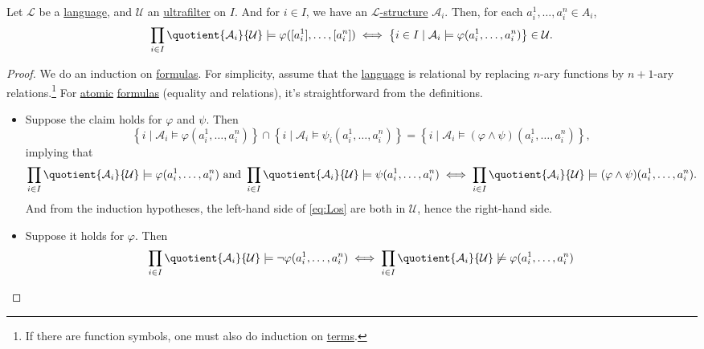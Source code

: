 \begin{theorem}\label{thm:Los}
	Let \(\mathcal{L} \) be a \hyperref[def:language]{language}, and \(\mathcal{U} \) an \hyperref[def:ultrafilter]{ultrafilter} on \(I\). And for \(i\in I\), we have an \hyperref[def:structure]{\(\mathcal{L} \)-structure} \(\mathcal{A} _i\). Then, for each \(a_i^1, \dots , a_i^n\in A_i\),
	\[
		\prod_{i\in I} \quotient{\mathcal{A} _i}{\mathcal{U} } \models \varphi ([a_i^1], \dots , [a_i^n]) \iff \left\{ i\in I \mid \mathcal{A} _i \models \varphi (a_i^1, \dots , a_i^n) \right\} \in \mathcal{U} .
	\]
\end{theorem}
\begin{proof}
	We do an induction on \hyperref[def:formula]{formulas}. For simplicity, assume that the \hyperref[def:language]{language} is relational by replacing \(n\)-ary functions by \(n+1\)-ary relations.\footnote{If there are function symbols, one must also do induction on \hyperref[def:term]{terms}.} For \hyperref[not:atomic]{atomic} \hyperref[def:formula]{formulas} (equality and relations), it's straightforward from the definitions.
	\begin{itemize}
		\item Suppose the claim holds for \(\varphi \) and \(\psi \). Then
		      \begin{equation}\label{eq:Los}
			      \left\{ i \mid \mathcal{A} _i \models \varphi (a_i^1, \dots , a_i^n) \right\}
			      \cap \left\{ i \mid \mathcal{A} _i \models \psi _i(a_i^1, \dots , a_i^n) \right\}
			      = \left\{ i \mid \mathcal{A} _i \models (\varphi \land \psi )(a_i^1, \dots , a_i^n) \right\},
		      \end{equation}
		      implying that
		      \[
			      \prod_{i\in I} \quotient{\mathcal{A} _i}{\mathcal{U} } \models \varphi (a_i^1, \dots , a_i^n)
			      \text{ and } \prod_{i\in I} \quotient{\mathcal{A} _i}{\mathcal{U} } \models \psi (a_i^1, \dots , a_i^n)
			      \iff \prod_{i\in I} \quotient{\mathcal{A} _i}{\mathcal{U} } \models (\varphi \land \psi )(a_i^1, \dots , a_i^n).
		      \]
		      And from the induction hypotheses, the left-hand side of \autoref{eq:Los} are both in \(\mathcal{U} \), hence the right-hand side.
		\item Suppose it holds for \(\varphi \). Then
		      \[
			      \begin{split}
				      \prod_{i\in I} \quotient{\mathcal{A}_i }{\mathcal{U} } \models \lnot \varphi (a_i^1, \dots , a_i^n)
				      &\iff \prod_{i\in I} \quotient{\mathcal{A}_i }{\mathcal{U} } \not \models \varphi (a_i^1, \dots , a_i^n)\\

\end{split}\]
\end{itemize}
\end{proof}
